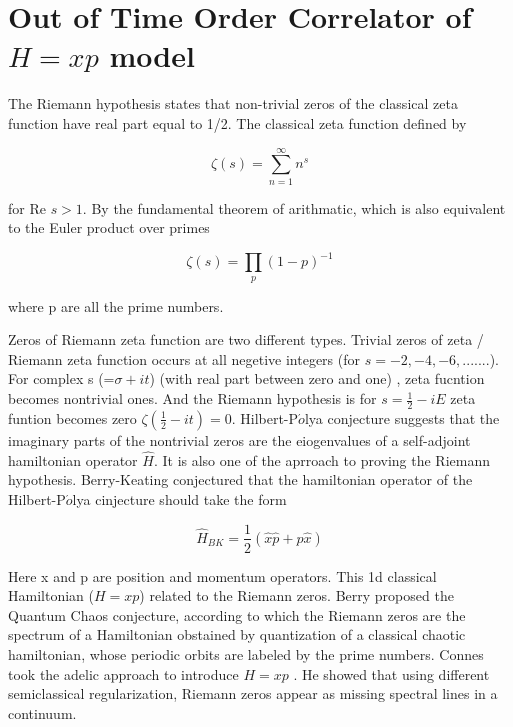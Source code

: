 \documentclass[12pt, letterpaper]{article}
\newcommand*{\1}{\hspace{1pt}}
\begin{document}
    

    
    \section{Out of Time Order Correlator of $H=xp$ model}

    The Riemann hypothesis states that non-trivial zeros of the classical zeta function have real part equal to 1/2. The classical zeta function defined by

    \begin{equation}
        \zeta (s) = \sum_{n = 1}^{\infty} n^{s} 
    \end{equation}

    for Re $s > 1$. 
    By the fundamental theorem of arithmatic, which is also equivalent to the Euler product over primes

    \begin{equation}
        \zeta (s) = \prod _{p} (1-p) ^{-1}
    \end{equation}

    where p are all the prime numbers.

    Zeros of Riemann zeta function are two different types. Trivial zeros of zeta / Riemann zeta function occurs at all negetive integers (for $s = -2, -4, -6, .......$). 
    For complex s (=$\sigma + it $) (with real part between zero and one) , zeta fucntion becomes nontrivial ones. And the Riemann hypothesis is for $s=\frac{1}{2}-iE$
    zeta funtion becomes zero $\zeta(\frac{1}{2}-it) = 0$. Hilbert-P$\acute{o}$lya conjecture suggests that the imaginary parts of the nontrivial zeros are the eiogenvalues 
    of a self-adjoint hamiltonian operator $\hat{H}$. It is also one of the aprroach to proving the Riemann hypothesis. Berry-Keating conjectured that the hamiltonian operator
    of the Hilbert-P$\acute{o}$lya  cinjecture should take the form\cite{s1} 

    \begin{equation}
        \hat{H} _{BK} = \frac{1}{2}(\hat{x}\hat{p} + \hat{p}\hat{x})
    \end{equation}

    Here x and p are position and momentum operators. This 1d classical Hamiltonian ($H = xp$) related to the Riemann zeros.\cite{s1} Berry proposed the Quantum Chaos conjecture, according to 
    which the Riemann zeros are the spectrum of a Hamiltonian obstained by quantization of a classical chaotic hamiltonian, whose periodic orbits are labeled by the prime numbers.
    Connes took the adelic approach to introduce $H = xp $ \cite{s2}. He showed that using different semiclassical regularization, Riemann zeros appear as missing spectral lines in a continuum.
\end{document}
